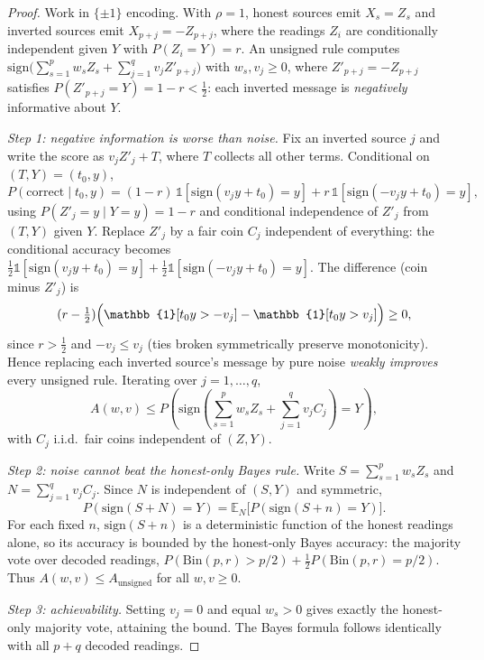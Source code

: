 \begin{proof}
Work in $\{\pm 1\}$ encoding. With $\rho = 1$, honest sources emit
$X_s = Z_s$ and inverted sources emit $X_{p+j} = -Z_{p+j}$, where the
readings $Z_i$ are conditionally independent given $Y$ with
$P(Z_i = Y) = r$. An unsigned rule computes
$\mathrm{sign}\bigl(\sum_{s=1}^p w_s Z_s + \sum_{j=1}^q v_j Z'_{p+j}\bigr)$
with $w_s, v_j \geq 0$, where $Z'_{p+j} = -Z_{p+j}$ satisfies
$P(Z'_{p+j} = Y) = 1 - r < \tfrac{1}{2}$: each inverted message is
\emph{negatively} informative about $Y$.

\textit{Step 1: negative information is worse than noise.}
Fix an inverted source $j$ and write the score as $v_j Z'_j + T$, where
$T$ collects all other terms. Conditional on $(T, Y) = (t_0, y)$,
\[
P(\text{correct} \mid t_0, y)
= (1-r)\,\mathbb{1}[\mathrm{sign}(v_j y + t_0) = y]
+ r\,\mathbb{1}[\mathrm{sign}(-v_j y + t_0) = y],
\]
using $P(Z'_j = y \mid Y = y) = 1 - r$ and conditional independence of
$Z'_j$ from $(T, Y)$ given $Y$. Replace $Z'_j$ by a fair coin $C_j$
independent of everything: the conditional accuracy becomes
$\tfrac{1}{2}\mathbb{1}[\mathrm{sign}(v_j y + t_0) = y]
+ \tfrac{1}{2}\mathbb{1}[\mathrm{sign}(-v_j y + t_0) = y]$.
The difference (coin minus $Z'_j$) is
\[
(r-\tfrac{1}{2})\Bigl(\mathbb{1}[t_0 y > -v_j]
- \mathbb{1}[t_0 y > v_j]\Bigr) \geq 0,
\]
since $r > \tfrac{1}{2}$ and $-v_j \leq v_j$ (ties broken symmetrically
preserve monotonicity). Hence replacing each inverted source's message
by pure noise \emph{weakly improves} every unsigned rule. Iterating over
$j = 1, \dots, q$,
\[
A(w, v) \leq
P\!\left(\mathrm{sign}\!\left(\sum_{s=1}^p w_s Z_s
+ \sum_{j=1}^q v_j C_j\right) = Y\right),
\]
with $C_j$ i.i.d.\ fair coins independent of $(Z, Y)$.

\textit{Step 2: noise cannot beat the honest-only Bayes rule.}
Write $S = \sum_{s=1}^p w_s Z_s$ and $N = \sum_{j=1}^q v_j C_j$.
Since $N$ is independent of $(S, Y)$ and symmetric,
\[
P(\mathrm{sign}(S + N) = Y)
= \mathbb{E}_N\bigl[P(\mathrm{sign}(S + n) = Y)\bigr].
\]
For each fixed $n$, $\mathrm{sign}(S + n)$ is a deterministic function
of the honest readings alone, so its accuracy is bounded by the
honest-only Bayes accuracy: the majority vote over decoded readings,
$P(\mathrm{Bin}(p,r) > p/2) + \tfrac{1}{2}P(\mathrm{Bin}(p,r) = p/2)$.
Thus $A(w, v) \leq A_{\mathrm{unsigned}}$ for all $w, v \geq 0$.

\textit{Step 3: achievability.} Setting $v_j = 0$ and equal $w_s > 0$
gives exactly the honest-only majority vote, attaining the bound. The
Bayes formula follows identically with all $p+q$ decoded readings.
\end{proof}

